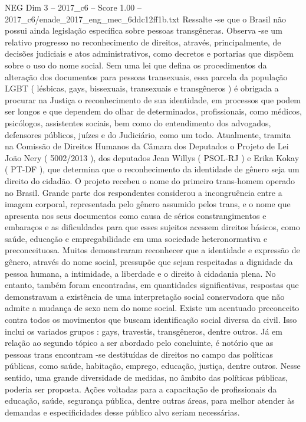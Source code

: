 \begin{textsample}{NEG Dim 3 – 2017\_c6 – Score 1.00 – 2017\_c6/enade\_2017\_eng\_mec\_6ddc12ff1b.txt}
Ressalte -se que o Brasil não possui ainda legislação específica sobre pessoas transgêneras.
Observa -se um relativo progresso no reconhecimento de direitos, através, principalmente, de decisões judiciais e atos administrativos, como decretos e portarias que dispõem sobre o uso do nome social.
Sem uma lei que defina os procedimentos da alteração dos documentos para pessoas transexuais, essa parcela da população LGBT ( lésbicas, gays, bissexuais, transexuais e transgêneros ) é obrigada a procurar na Justiça o reconhecimento de sua identidade, em processos que podem ser longos e que dependem do olhar de determinados, profissionais, como médicos, psicólogos, assistentes sociais, bem como do entendimento dos advogados, defensores públicos, juízes e do Judiciário, como um todo.
Atualmente, tramita na Comissão de Direitos Humanos da Câmara dos Deputados o Projeto de Lei João Nery ( 5002/2013 ), dos deputados Jean Willys ( PSOL-RJ ) e Erika Kokay ( PT-DF ), que determina que o reconhecimento da identidade de gênero seja um direito do cidadão.
O projeto recebeu o nome do primeiro trans-homem operado no Brasil.
Grande parte dos respondentes considerou a incongruência entre a imagem corporal, representada pelo gênero assumido pelos trans, e o nome que apresenta nos seus documentos como causa de sérios constrangimentos e embaraços e as dificuldades para que esses sujeitos acessem direitos básicos, como saúde, educação e empregabilidade em uma sociedade heteronormativa e preconceituosa.
Muitos demonstraram reconhecer que a identidade e expressão de gênero, através do nome social, pressupõe que sejam respeitadas a dignidade da pessoa humana, a intimidade, a liberdade e o direito à cidadania plena.
No entanto, também foram encontradas, em quantidades significativas, respostas que demonstravam a existência de uma interpretação social conservadora que não admite a mudança de sexo nem do nome social.
Existe um acentuado preconceito contra todos os movimentos que buscam identificação social diversa da civil.
Isso inclui os variados grupos : gays, travestis, transgêneros, dentre outros.
Já em relação ao segundo tópico a ser abordado pelo concluinte, é notório que as pessoas trans encontram -se destituídas de direitos no campo das políticas públicas, como saúde, habitação, emprego, educação, justiça, dentre outros.
Nesse sentido, uma grande diversidade de medidas, no âmbito das políticas públicas, poderia ser proposta.
Ações voltadas para a capacitação de profissionais da educação, saúde, segurança pública, dentre outras áreas, para melhor atender às demandas e especificidades desse público alvo seriam necessárias.

\end{textsample}
